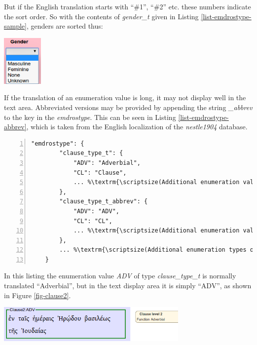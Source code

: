 \documentclass[11pt,oneside,a4paper]{memoir}
\begin{document}
But if the English translation starts with ``\#1'', ``\#2'' etc. these numbers indicate the sort
order. So with the contents of \emph{gender\_t} given in Listing \ref{list-emdrostype-sample},
genders are sorted thus:

\begin{center}
  \includegraphics[width=0.148\textwidth]{gender.png}
\end{center}


If the translation of an enumeration value is long, it may not display well in the text area.
Abbreviated versions may be provided by appending the string \emph{\_abbrev} to the key in the
\emph{emdrostype}. This can be seen in Listing \ref{list-emdrostype-abbrev}, which is taken from
the English localization of the \emph{nestle1904} database.

\begin{lstlisting}[numbers=left,caption=Abbreviated emdrostype values,label=list-emdrostype-abbrev]
    "emdrostype": {
        "clause_type_t": {
            "ADV": "Adverbial",
            "CL": "Clause",
            ... %\textrm{\scriptsize(Additional enumeration values omitted)}%
        },
        "clause_type_t_abbrev": {
            "ADV": "ADV",
            "CL": "CL",
            ... %\textrm{\scriptsize(Additional enumeration values omitted)}%
        },
        ... %\textrm{\scriptsize(Additional enumeration types omitted)}%
    }
\end{lstlisting}

In this listing the enumeration value \emph{ADV} of type \emph{clause\_type\_t} is normally translated ``Adverbial'', but in
the text display area it is simply ``ADV'', as shown in Figure \ref{fig-clause2}.

\begin{center}
  \parbox{0.7\textwidth}{
    \includegraphics[width=0.7\textwidth]{clause2.png}
    \label{fig-clause2}
  }
\end{center}
\end{document}
